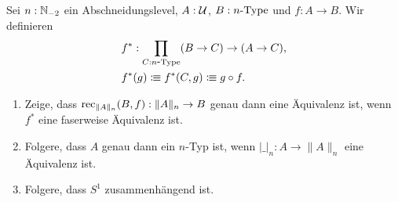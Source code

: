 \documentclass{uebung}
\begin{document}
\begin{exercise}
  Sei $n:\mathbb{N}_{-2}$ ein Abschneidungslevel, $A:\mathcal{U}$, $B:n\mbox{-}\mathrm{Type}$ und $f:A\to B$.
  Wir definieren
  \begin{align*}
    &f^*:\prod_{C:n\mbox{-}\mathrm{Type}}(B \to C) \to (A \to C),\\
    &f^*(g)\vcentcolon\mspace{-1.2mu}\equiv f^*(C,g)\vcentcolon\mspace{-1.2mu}\equiv g\circ f.
  \end{align*}
  \begin{enumerate}
    \item Zeige, dass $\mathrm{rec}_{\|A\|_n}(B,f):\|A\|_n\to B$ genau dann eine Äquivalenz ist, wenn $f^*$ eine faserweise Äquivalenz ist.
    \item Folgere, dass $A$ genau dann ein $n$-Typ ist, wenn $|\_|_n:A\to \|A\|_n$ eine Äquivalenz ist.
    \item Folgere, dass $S^1$ zusammenhängend ist.
  \end{enumerate}
\end{exercise}
\end{document}
